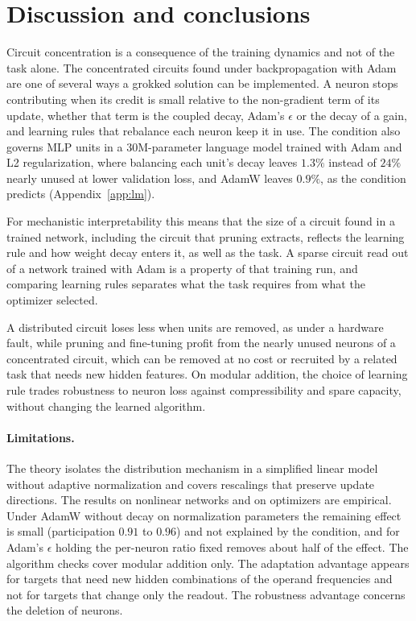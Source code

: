 \documentclass{article} %
\begin{document}
\section{Discussion and conclusions}

Circuit concentration is a consequence of the training dynamics and not of the task alone. The concentrated circuits found under backpropagation with Adam are one of several ways a grokked solution can be implemented. A neuron stops contributing when its credit is small relative to the non-gradient term of its update, whether that term is the coupled decay, Adam's $\epsilon$ or the decay of a gain, and learning rules that rebalance each neuron keep it in use. The condition also governs MLP units in a $30$M-parameter language model trained with Adam and L2 regularization, where balancing each unit's decay leaves $1.3\%$ instead of $24\%$ nearly unused at lower validation loss, and AdamW leaves $0.9\%$, as the condition predicts (Appendix~\ref{app:lm}).

For mechanistic interpretability this means that the size of a circuit found in a trained network, including the circuit that pruning extracts, reflects the learning rule and how weight decay enters it, as well as the task. A sparse circuit read out of a network trained with Adam is a property of that training run, and comparing learning rules separates what the task requires from what the optimizer selected.

A distributed circuit loses less when units are removed, as under a hardware fault, while pruning and fine-tuning profit from the nearly unused neurons of a concentrated circuit, which can be removed at no cost or recruited by a related task that needs new hidden features. On modular addition, the choice of learning rule trades robustness to neuron loss against compressibility and spare capacity, without changing the learned algorithm.

\paragraph{Limitations.} The theory isolates the distribution mechanism in a simplified linear model without adaptive normalization and covers rescalings that preserve update directions. The results on nonlinear networks and on optimizers are empirical. Under AdamW without decay on normalization parameters the remaining effect is small (participation $0.91$ to $0.96$) and not explained by the condition, and for Adam's $\epsilon$ holding the per-neuron ratio fixed removes about half of the effect. The algorithm checks cover modular addition only. The adaptation advantage appears for targets that need new hidden combinations of the operand frequencies and not for targets that change only the readout. The robustness advantage concerns the deletion of neurons.
\end{document}
